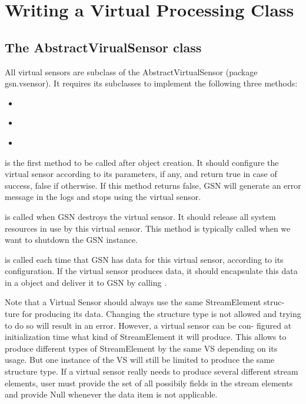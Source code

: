 \graphicspath{{chapters/ch-developer-guide/figures/}}

\section{Writing a Virtual Processing Class \label{sec:vsp}}

\subsection{The AbstractVirualSensor class}

All virtual sensors are subclass of the AbstractVirtualSensor (package gsn.vsensor).
It requires its subclasses to implement the following three methods:
\begin{itemize}
 \item {}\\
 \item {}\\
 \item {}\\
\end{itemize}
 is the first method to be called after object creation. It should
configure the virtual sensor according to its parameters, if any, and return true
in case of success, false if otherwise. If this method returns false, GSN will
generate an error message in the logs and stops using the virtual sensor.

 is called when GSN destroys the virtual sensor. It should release
all system resources in use by this virtual sensor. This method is typically called
when we want to shutdown the GSN instance.

 is called each time that GSN has data for this virtual sensor,
according to its configuration. If the virtual sensor produces data, it should
encapsulate this data in a  object and deliver it to GSN by
calling .

Note that a Virtual Sensor should always use the same StreamElement struc-
ture for producing its data. Changing the structure type is not allowed and
trying to do so will result in an error. However, a virtual sensor can be con-
figured at initialization time what kind of StreamElement it will produce. This
allows to produce different types of StreamElement by the same VS depending
on its usage. But one instance of the VS will still be limited to produce the
same structure type. If a virtual sensor really needs to produce several different
stream elements, user must provide the set of all possibily fields in the stream
elements and provide Null whenever the data item is not applicable.

